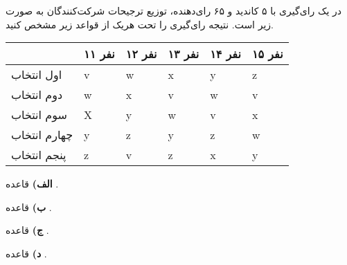 در یک رای‌گیری با ۵ کاندید و ۶۵ رای‌دهنده، توزیع ترجیحات شرکت‌کنندگان به صورت زیر است. نتیجه رای‌گیری را تحت هریک از قواعد زیر مشخص کنید.
\LTR
\begin{center}
    \begin{tabularx}{0.9\textwidth}{|Y|Y|Y|Y|Y|Y|} \hline
     & نفر ۱۱ & نفر ۱۲ & نفر ۱۳ & نفر ۱۴ & نفر ۱۵ \\ \hline
    اول انتخاب     & v & w & x & y & z \\ \hline
    دوم انتخاب     & w & x & v & w & v \\ \hline
    سوم انتخاب    & X & y & w & v & x \\ \hline
    چهارم انتخاب   & y & z & y & z & w \\ \hline
    پنجم انتخاب    & z & v & z & x & y \\ \hline
    \end{tabularx}
\end{center}
\RTL

\vspace*{5pt}
\textbf{الف)}
قاعده
.

\vspace*{5pt}
\textbf{ب)}
قاعده
.

\vspace*{5pt}
\textbf{ج)}
قاعده
.

\vspace*{5pt}
\textbf{د)}
قاعده
.